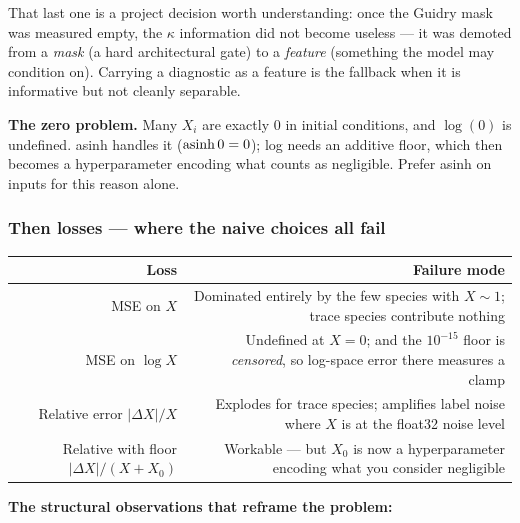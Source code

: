 That last one is a project decision worth understanding: once the Guidry mask
was measured empty, the $\kappa$ information did not become useless --- it was
demoted from a \emph{mask} (a hard architectural gate) to a \emph{feature}
(something the model may condition on). Carrying a diagnostic as a feature is
the fallback when it is informative but not cleanly separable.

\textbf{The zero problem.} Many $X_i$ are exactly 0 in initial conditions, and
$\log(0)$ is undefined. asinh handles it ($\operatorname{asinh} 0 = 0$); log needs an additive
floor, which then becomes a hyperparameter encoding what counts as negligible.
Prefer asinh on inputs for this reason alone.

\subsubsection{Then losses --- where the naive choices all fail}
\label{sec:losses}

\begin{center}
\small
\begin{tabularx}{\textwidth}{@{}R{0.75} R{1.25}@{}}
\toprule
\textbf{Loss} & \textbf{Failure mode} \\
\midrule
MSE on $X$ &
  Dominated entirely by the few species with $X \sim 1$; trace species
  contribute nothing \\
MSE on $\log X$ &
  Undefined at $X = 0$; and the $10^{-15}$ floor is \emph{censored}, so
  log-space error there measures a clamp \\
Relative error $|\Delta X|/X$ &
  Explodes for trace species; amplifies label noise where $X$ is at the float32
  noise level \\
Relative with floor $|\Delta X|/(X + X_0)$ &
  Workable --- but $X_0$ is now a hyperparameter encoding what you consider
  negligible \\
\bottomrule
\end{tabularx}
\end{center}

\textbf{The structural observations that reframe the problem:}

